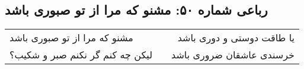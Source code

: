\begin{center}
\section*{رباعی شماره ۵۰: مشنو که مرا از تو صبوری باشد}
\label{sec:050}
\begin{longtable}{l p{0.5cm} r}
مشنو که مرا از تو صبوری باشد
&&
یا طاقت دوستی و دوری باشد
\\
لیکن چه کنم گر نکنم صبر و شکیب؟
&&
خرسندی عاشقان ضروری باشد
\\
\end{longtable}
\end{center}
